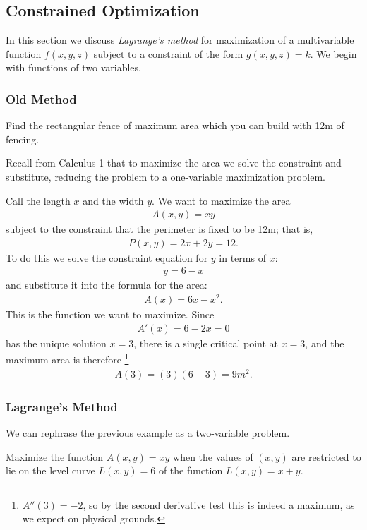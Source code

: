\documentclass[12pt,letterpaper,reqno]{article}
\numberwithin{equation}{section}
\begin{document}
{\subsection{Constrained Optimization}
In this section we discuss \emph{Lagrange's method} for maximization of a multivariable function $f(x,y,z)$ subject to a constraint of the form $g(x,y,z)=k$. We begin with functions of two variables.
\subsubsection{Old Method}
\begin{example}
Find the rectangular fence of maximum area which you can build with 12m of fencing.	
\end{example}

\begin{solution}
	Recall from Calculus 1 that to maximize the area we solve the constraint and substitute, reducing the problem to a one-variable maximization problem. 
	
	Call the length $x$ and the width $y$. We want to maximize the area
	\begin{align*}
		A(x,y)=xy
	\end{align*}
	subject to the constraint that the perimeter is fixed to be 12m; that is, 
	\begin{align*}
		P(x,y)=2x+2y=12.
	\end{align*}
	To do this we solve the constraint equation for $y$ in terms of $x$:
	\begin{align*}
		y=6-x
	\end{align*}
	and substitute it into the formula for the area:
	\begin{align*}
		A(x)=6x-x^2.
	\end{align*}
	This is the function we want to maximize. Since
	\begin{align*}
		A'(x)=6-2x=0
	\end{align*}
	has the unique solution $x=3$, there is a single critical point at $x=3$, and the maximum area is therefore \footnote{$A''(3)=-2$, so by the second derivative test this is indeed a maximum, as we expect on physical grounds.}
	\begin{align*}
		A(3)=(3)(6-3)=9m^2.
	\end{align*}
\end{solution}
\newpage 
\subsubsection{Lagrange's Method}
We can rephrase the previous example as a two-variable problem.
\begin{example}
Maximize the function $A(x,y)=xy$ when the values of $(x,y)$ are restricted to lie on the level curve $L(x,y)=6$ of the function $L(x,y)=x+y$.
\end{example}

}
\end{document}
